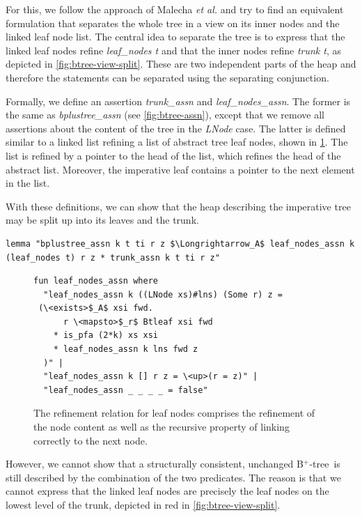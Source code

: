 \documentclass[a4paper,UKenglish,cleveref, cref, thm-restate]{lipics-v2021}
\newcommand{\btree}{B$^+$-tree}
\begin{document}
For this, we follow the approach of Malecha \emph{et al.} \cite{DBLP:conf/popl/MalechaMSW10} and
try to find an equivalent formulation that separates the whole tree in a
view on its inner nodes and the linked leaf node list.
The central idea to separate the tree is to
express that the linked leaf nodes refine \emph{leaf\_nodes t}
and that the inner nodes refine \emph{trunk t}, as depicted in \cref{fig:btree-view-split}.
These are two independent parts of the heap and therefore
the statements can be separated using the separating conjunction.

Formally, we define an assertion \emph{trunk\_assn} and \emph{leaf\_nodes\_assn}.
The former is the same as \emph{bplustree\_assn} (see \cref{fig:btree-assn}),
except that we remove all assertions about the content of the tree in the \emph{LNode} case.
The latter is defined similar to a linked list refining a list of abstract tree leaf nodes,
shown in \cref{fig:leaf-nodes-assn}.
The list is refined by a pointer to the head of the list,
which refines the head of the abstract list.
Moreover, the imperative leaf contains a pointer to the next element in the list.

With these definitions, we can show that the heap describing the imperative tree may be
split up into its leaves and the trunk.

\begin{lstlisting}[mathescape=true, language=Isabelle,label=lst:btree-view-split-oneway]
lemma "bplustree_assn k t ti r z $\Longrightarrow_A$ leaf_nodes_assn k (leaf_nodes t) r z * trunk_assn k t ti r z"
\end{lstlisting}

\begin{figure}
    \centering
\begin{lstlisting}[mathescape=true, language=Isabelle,label=lst:leaf-nodes-assn]
fun leaf_nodes_assn where
  "leaf_nodes_assn k ((LNode xs)#lns) (Some r) z =
 (\<exists>$_A$ xsi fwd.
      r \<mapsto>$_r$ Btleaf xsi fwd
    * is_pfa (2*k) xs xsi
    * leaf_nodes_assn k lns fwd z
  )" |
  "leaf_nodes_assn k [] r z = \<up>(r = z)" |
  "leaf_nodes_assn _ _ _ _ = false"
\end{lstlisting}
\caption[Definition of \emph{leaf\_nodes\_assn}]{
    The refinement relation for leaf nodes comprises the refinement
    of the node content as well as the recursive property of linking correctly to the next node.
}
\label{fig:leaf-nodes-assn}
\end{figure}


However, we cannot show that a structurally consistent, unchanged \btree\
is still described by the combination of the two predicates.
The reason is that we cannot express that the linked leaf nodes
are precisely the leaf nodes on the lowest level of the trunk, depicted
in red in \cref{fig:btree-view-split}.
\end{document}
